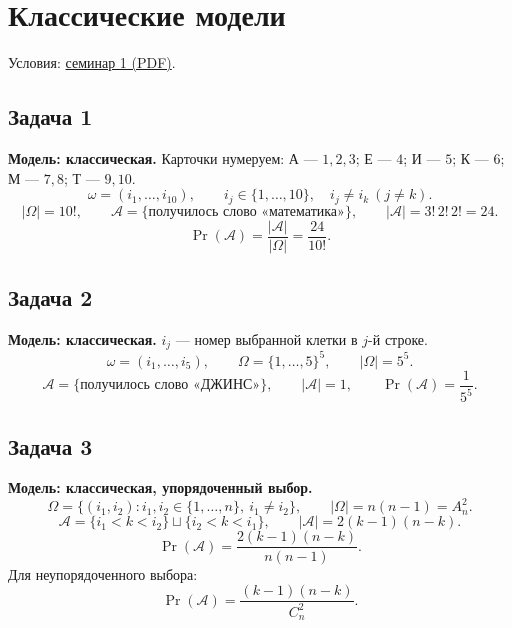 \section{Классические модели}

\noindent Условия:
\href{run:conditions/sem_01.pdf}{семинар 1 (PDF)}.

\subsection{Задача 1}

\begin{solution}
    \textbf{Модель: классическая.}
    Карточки нумеруем: А --- $1,2,3$; Е --- $4$; И --- $5$;
    К --- $6$; М --- $7,8$; Т --- $9,10$.
    \[
        \omega=(i_1,\ldots,i_{10}),\qquad
        i_j\in\{1,\ldots,10\},\quad i_j\neq i_k\ (j\neq k).
    \]
    \[
        |\Omega|=10!,\qquad
        \mathcal{A}=\{\text{получилось слово «математика»}\},
        \qquad |\mathcal{A}|=3!\,2!\,2!=24.
    \]
    \[
        \Pr(\mathcal{A})=\frac{|\mathcal{A}|}{|\Omega|}
        =\boxed{\frac{24}{10!}}.
    \]
\end{solution}

\subsection{Задача 2}

\begin{solution}
    \textbf{Модель: классическая.}
    $i_j$ --- номер выбранной клетки в $j$-й строке.
    \[
        \omega=(i_1,\ldots,i_5),\qquad
        \Omega=\{1,\ldots,5\}^5,\qquad |\Omega|=5^5.
    \]
    \[
        \mathcal{A}=\{\text{получилось слово «ДЖИНС»}\},\qquad
        |\mathcal{A}|=1,\qquad
        \Pr(\mathcal{A})=\boxed{\frac1{5^5}}.
    \]
\end{solution}

\subsection{Задача 3}

\begin{solution}
    \textbf{Модель: классическая, упорядоченный выбор.}
    \[
        \Omega=\{(i_1,i_2):i_1,i_2\in\{1,\ldots,n\},\ i_1\neq i_2\},
        \qquad |\Omega|=n(n-1)=A_n^2.
    \]
    \[
        \mathcal{A}=\{i_1<k<i_2\}\sqcup\{i_2<k<i_1\},
        \qquad |\mathcal{A}|=2(k-1)(n-k).
    \]
    \[
        \Pr(\mathcal{A})=\boxed{\frac{2(k-1)(n-k)}{n(n-1)}}.
    \]
    Для неупорядоченного выбора:
    \[
        \Pr(\mathcal{A})=\frac{(k-1)(n-k)}{C_n^2}.
    \]
\end{solution}

